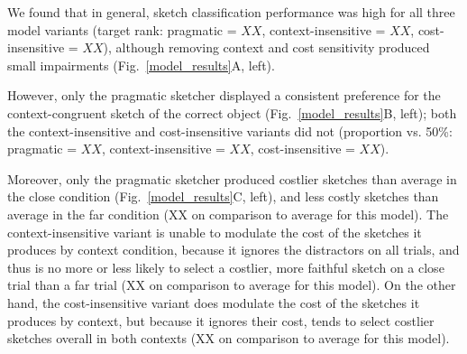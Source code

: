 \documentclass[9pt,twocolumn,twoside]{pnas-new}
\begin{document}
We found that in general, sketch classification performance was high for all three model variants (target rank: pragmatic = $XX$, context-insensitive = $XX$, cost-insensitive = $XX$), although removing context and cost sensitivity produced small impairments (Fig.~\ref{model_results}A, left).

However, only the pragmatic sketcher displayed a consistent preference for the context-congruent sketch of the correct object (Fig.~\ref{model_results}B, left); both the context-insensitive and cost-insensitive variants did not (proportion vs. 50\%: pragmatic = $XX$, context-insensitive = $XX$, cost-insensitive = $XX$). 

Moreover, only the pragmatic sketcher produced costlier sketches than average in the close condition (Fig.~\ref{model_results}C, left), and less costly sketches than average in the far condition (XX on comparison to average for this model). The context-insensitive variant is unable to modulate the cost of the sketches it produces by context condition, because it ignores the distractors on all trials, and thus is no more or less likely to select a costlier, more faithful sketch on a close trial than a far trial (XX on comparison to average for this model). On the other hand, the cost-insensitive variant does modulate the cost of the sketches it produces by context, but because it ignores their cost, tends to select costlier sketches overall in both contexts (XX on comparison to average for this model). 
\end{document}
